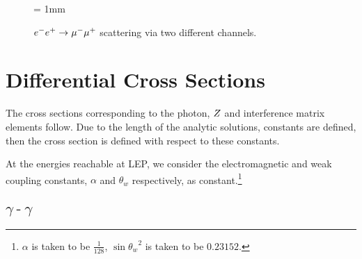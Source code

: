 \documentclass[]{article}
\begin{document}
\begin{figure}[h]
	\vspace{10pt}
	\unitlength = 1mm
	\centering
	\qquad
	\caption{$e^{-}e^{+}\rarrow\mu^{-}\mu^{+}$ scattering via two different channels.}
\end{figure}

\newpage

\appendix
\section{Differential Cross Sections}\label{app:differentials}

The cross sections corresponding to the photon, $Z $ and interference matrix elements follow. Due to the length of the analytic solutions, constants are defined, then the cross section is defined with respect to these constants.

At the energies reachable at LEP, we consider the electromagnetic and weak coupling constants, $\alpha$ and $\theta_{w}$ respectively, as constant.\footnote{$\alpha$ is taken to be $\frac{1}{128}$, $\sin{\theta_{w}}^{2}$ is taken to be $0.23152$.}

\subsection{$\gamma\operatorname{-}\gamma$}
\end{document}
